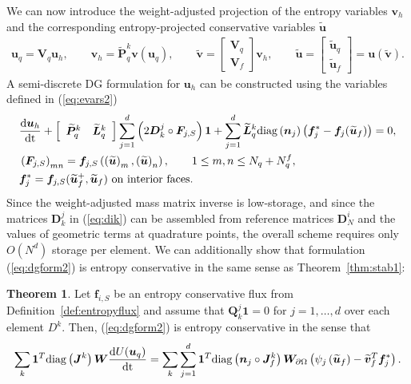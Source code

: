 \documentclass[preprint,10pt]{article}
\theoremstyle{definition}
\theoremstyle{lemma}
\theoremstyle{theorem}
\newtheorem{theorem}{Theorem}
\theoremstyle{assumption}
\renewcommand{\tilde}{\widetilde}
\newcommand{\td}[2]{\frac{{\rm d}#1}{{\rm d}{\rm #2}}}
\newcommand{\LRp}[1]{\left( #1 \right)}
\newcommand{\LRs}[1]{\left[ #1 \right]}
\newcommand{\diag}[1]{{\rm diag}\LRp{#1}}
\begin{document}
{We can now introduce the weight-adjusted projection of the entropy variables $\bm{v}_h$ and the corresponding entropy-projected conservative variables $\tilde{\bm{u}}$ 
\begin{align}
\bm{u}_q = \bm{V}_q \bm{u}_h, \qquad \bm{v}_h = \tilde{\bm{P}}^k_q \bm{v}\LRp{\bm{u}_q}, \qquad 
\tilde{\bm{v}} = \LRs{\begin{array}{c}
\bm{V}_q\\
\bm{V}_f
\end{array}}\bm{v}_h, \qquad \tilde{\bm{u}} =  \LRs{\begin{array}{c}
\tilde{\bm{u}}_q\\
\tilde{\bm{u}}_f
\end{array}} = \bm{u}\LRp{\tilde{\bm{v}}}.
\label{eq:evars2}
\end{align}
A semi-discrete DG formulation for $\bm{u}_h$ can be constructed using the variables defined in (\ref{eq:evars2})
\begin{align}
&\td{\bm{u}_h}{t} + \LRs{\begin{array}{cc}\tilde{\bm{P}}^k_q & \tilde{\bm{L}}^k_q\end{array}}
  \sum_{j=1}^d \LRp{2\bm{D}^j_k \circ \bm{F}_{j,S}}\bm{1} + \sum_{j=1}^d \tilde{\bm{L}}^k_q \diag{\bm{n}_j}\LRp{\bm{f}_j^* - \bm{f}_j(\tilde{\bm{u}}_f)} = 0,\label{eq:dgform2}\\
  &\LRp{\bm{F}_{j,S}}_{mn} = \bm{f}_{j,S}\LRp{\LRp{\tilde{\bm{u}}}_m,\LRp{\tilde{\bm{u}}}_n}, \qquad 1 \leq m,n \leq N_q + N^f_q,\nonumber\\
  &\bm{f}_j^* = \bm{f}_{j,S}(\tilde{\bm{u}}_f^+,\tilde{\bm{u}}_f) \text{ on interior faces}.\nonumber
\end{align}
Since the  weight-adjusted mass matrix inverse is low-storage, and since the matrices $\bm{D}^j_k$ in (\ref{eq:dik}) can be assembled from reference matrices $\bm{D}^i_N$ and the values of geometric terms at quadrature points, the overall scheme requires only $O(N^d)$ storage per element.  We can additionally show that formulation (\ref{eq:dgform2}) is entropy conservative in the same sense as Theorem~\ref{thm:stab1}: 
\begin{theorem}
  Let $\bm{f}_{i,S}$ be an entropy conservative flux from Definition~\ref{def:entropyflux} and assume that $\bm{Q}^j_k\bm{1} = 0$ for $j = 1,\ldots,d$ over each element $D^k$.  Then, (\ref{eq:dgform2}) is entropy conservative in the sense that
\[
  \sum_k \bm{1}^T\diag{\bm{J}^k}\bm{W}\td{U(\bm{u}_q)}{t} = \sum_k \sum_{j=1}^d \bm{1}^T\diag{\bm{n}_j\circ\bm{J}^k_f}\bm{W}_{\partial \Omega} \LRp{\psi_j\LRp{\tilde{\bm{u}}_f}-\tilde{\bm{v}}_f^T\bm{f}_j^*}.
\]
\end{theorem}}
\end{document}
